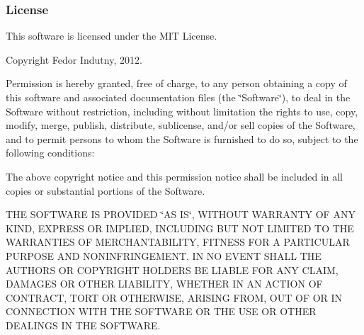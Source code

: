 \subsubsection*{License}

This software is licensed under the M\+IT License.

Copyright Fedor Indutny, 2012.

Permission is hereby granted, free of charge, to any person obtaining a copy of this software and associated documentation files (the \char`\"{}\+Software\char`\"{}), to deal in the Software without restriction, including without limitation the rights to use, copy, modify, merge, publish, distribute, sublicense, and/or sell copies of the Software, and to permit persons to whom the Software is furnished to do so, subject to the following conditions\+:

The above copyright notice and this permission notice shall be included in all copies or substantial portions of the Software.

T\+HE S\+O\+F\+T\+W\+A\+RE IS P\+R\+O\+V\+I\+D\+ED \char`\"{}\+A\+S I\+S\char`\"{}, W\+I\+T\+H\+O\+UT W\+A\+R\+R\+A\+N\+TY OF A\+NY K\+I\+ND, E\+X\+P\+R\+E\+SS OR I\+M\+P\+L\+I\+ED, I\+N\+C\+L\+U\+D\+I\+NG B\+UT N\+OT L\+I\+M\+I\+T\+ED TO T\+HE W\+A\+R\+R\+A\+N\+T\+I\+ES OF M\+E\+R\+C\+H\+A\+N\+T\+A\+B\+I\+L\+I\+TY, F\+I\+T\+N\+E\+SS F\+OR A P\+A\+R\+T\+I\+C\+U\+L\+AR P\+U\+R\+P\+O\+SE A\+ND N\+O\+N\+I\+N\+F\+R\+I\+N\+G\+E\+M\+E\+NT. IN NO E\+V\+E\+NT S\+H\+A\+LL T\+HE A\+U\+T\+H\+O\+RS OR C\+O\+P\+Y\+R\+I\+G\+HT H\+O\+L\+D\+E\+RS BE L\+I\+A\+B\+LE F\+OR A\+NY C\+L\+A\+IM, D\+A\+M\+A\+G\+ES OR O\+T\+H\+ER L\+I\+A\+B\+I\+L\+I\+TY, W\+H\+E\+T\+H\+ER IN AN A\+C\+T\+I\+ON OF C\+O\+N\+T\+R\+A\+CT, T\+O\+RT OR O\+T\+H\+E\+R\+W\+I\+SE, A\+R\+I\+S\+I\+NG F\+R\+OM, O\+UT OF OR IN C\+O\+N\+N\+E\+C\+T\+I\+ON W\+I\+TH T\+HE S\+O\+F\+T\+W\+A\+RE OR T\+HE U\+SE OR O\+T\+H\+ER D\+E\+A\+L\+I\+N\+GS IN T\+HE S\+O\+F\+T\+W\+A\+RE. 